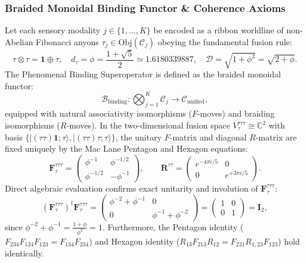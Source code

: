\documentclass[11pt,onecolumn]{article}
\begin{document}
\subsubsection{Braided Monoidal Binding Functor \& Coherence Axioms}
Let each sensory modality $j \in \{1, \dots, K\}$ be encoded as a ribbon worldline of non-Abelian Fibonacci anyons $\tau_j \in \mathrm{Obj}(\mathcal{C}_j)$ obeying the fundamental fusion rule:
\begin{equation}
\tau \otimes \tau = \mathbf{1} \oplus \tau, \quad d_\tau = \phi = \frac{1 + \sqrt{5}}{2} \simeq 1.6180339887, \quad \mathcal{D} = \sqrt{1 + \phi^2} = \sqrt{2 + \phi}.
\end{equation}
The Phenomenal Binding Superoperator is defined as the braided monoidal functor:
\begin{equation}
\mathcal{B}_{\mathrm{binding}}: \bigotimes_{j=1}^K \mathcal{C}_j \longrightarrow \mathcal{C}_{\mathrm{unified}},
\end{equation}
equipped with natural associativity isomorphisms ($F$-moves) and braiding isomorphisms ($R$-moves). In the two-dimensional fusion space $V^{\tau\tau\tau}_\tau \cong \mathbb{C}^2$ with basis $\{|(\tau\tau)\mathbf{1};\tau\rangle, |(\tau\tau)\tau;\tau\rangle\}$, the unitary $F$-matrix and diagonal $R$-matrix are fixed uniquely by the Mac Lane Pentagon and Hexagon equations:
\begin{equation}
\mathbf{F}^{\tau\tau\tau}_\tau = \begin{pmatrix} \phi^{-1} & \phi^{-1/2} \\ \phi^{-1/2} & -\phi^{-1} \end{pmatrix}, \qquad \mathbf{R}^{\tau\tau} = \begin{pmatrix} e^{-4\pi i / 5} & 0 \\ 0 & e^{+3\pi i / 5} \end{pmatrix}.
\label{eq:fib_fr_matrices}
\end{equation}
Direct algebraic evaluation confirms exact unitarity and involution of $\mathbf{F}^{\tau\tau\tau}_\tau$:
\begin{equation}
\left(\mathbf{F}^{\tau\tau\tau}_\tau\right)^\dagger \mathbf{F}^{\tau\tau\tau}_\tau = \begin{pmatrix} \phi^{-2} + \phi^{-1} & 0 \\ 0 & \phi^{-1} + \phi^{-2} \end{pmatrix} = \begin{pmatrix} 1 & 0 \\ 0 & 1 \end{pmatrix} = \mathbf{I}_2,
\end{equation}
since $\phi^{-2} + \phi^{-1} = \frac{1+\phi}{\phi^2} = 1$. Furthermore, the Pentagon identity ($F_{234} F_{124} F_{123} = F_{134} F_{234}$) and Hexagon identity ($R_{13} F_{213} R_{12} = F_{231} R_{1,23} F_{123}$) hold identically.
\end{document}
